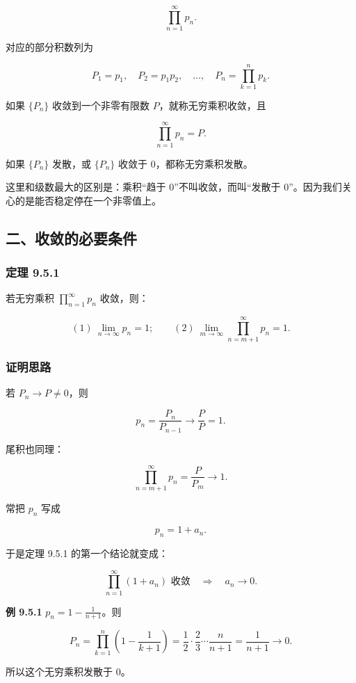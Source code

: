 \[
      \prod_{n=1}^{\infty}p_n.
    \]

对应的部分积数列为

\[
      P_1=p_1,\quad P_2=p_1p_2,\quad \ldots,\quad P_n=\prod_{k=1}^{n}p_k.
    \]

如果 \(\{P_n\}\) 收敛到一个非零有限数 \(P\)，就称无穷乘积收敛，且

\[
      \prod_{n=1}^{\infty}p_n=P.
    \]

如果 \(\{P_n\}\) 发散，或 \(\{P_n\}\) 收敛于 \(0\)，都称无穷乘积发散。

\begin{notebox}
这里和级数最大的区别是：乘积“趋于 0”不叫收敛，而叫“发散于 0”。因为我们关心的是能否稳定停在一个非零值上。
\end{notebox}

\subsection*{二、收敛的必要条件}

\subsubsection*{定理 9.5.1}

若无穷乘积 \(\prod_{n=1}^{\infty}p_n\) 收敛，则：

\[
      (1)\ \lim_{n\to\infty}p_n=1;
      \qquad
      (2)\ \lim_{m\to\infty}\prod_{n=m+1}^{\infty}p_n=1.
    \]

\subsubsection*{证明思路}

若 \(P_n\to P\neq0\)，则

\[
      p_n=\frac{P_n}{P_{n-1}}\to \frac{P}{P}=1.
    \]

尾积也同理：

\[
      \prod_{n=m+1}^{\infty}p_n=\frac{P}{P_m}\to 1.
    \]

常把 \(p_n\) 写成

\[
      p_n=1+a_n.
    \]

于是定理 9.5.1 的第一个结论就变成：

\[
      \prod_{n=1}^{\infty}(1+a_n)\text{ 收敛}\quad\Longrightarrow\quad a_n\to0.
    \]

\begin{conceptbox}
\textbf{例 9.5.1}
\(\displaystyle p_n=1-\frac{1}{n+1}\)。则

\[
          P_n=\prod_{k=1}^{n}\left(1-\frac{1}{k+1}\right)
          =\frac12\cdot\frac23\cdots\frac{n}{n+1}
          =\frac{1}{n+1}\to0.
        \]

所以这个无穷乘积发散于 \(0\)。
\end{conceptbox}

